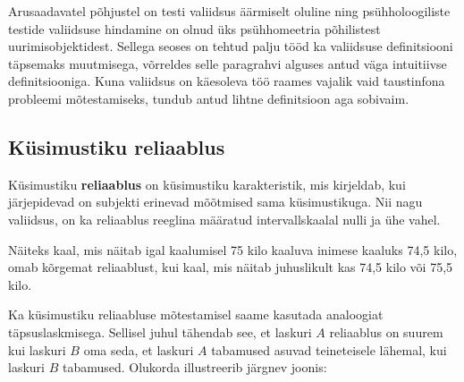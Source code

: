 \documentclass[a4paper,12pt,oneside]{article}
\numberwithin{equation}{section}
\theoremstyle{definition}
\begin{document}
Arusaadavatel põhjustel on testi valiidsus äärmiselt oluline ning psühholoogiliste testide valiidsuse hindamine on olnud üks psühhomeetria põhilistest uurimisobjektidest. Sellega seoses on tehtud palju tööd  ka valiidsuse definitsiooni täpsemaks muutmisega, võrreldes selle paragrahvi alguses antud väga intuitiivse definitsiooniga. Kuna valiidsus on käesoleva töö raames vajalik vaid taustinfona probleemi mõtestamiseks, tundub antud lihtne definitsioon aga sobivaim. 

\subsection{Küsimustiku reliaablus}

Küsimustiku \textbf{reliaablus} on küsimustiku karakteristik, mis kirjeldab, kui järje\-pidevad on subjekti erinevad mõõtmised sama küsimustikuga. Nii nagu valiidsus, on ka reliaablus reeglina määratud intervallskaalal nulli ja ühe vahel. 

Näiteks kaal, mis näitab igal kaalumisel 75 kilo kaaluva inimese kaaluks 74,5 kilo, omab kõrgemat reliaablust, kui kaal, mis näitab juhuslikult kas 74,5 kilo või 75,5 kilo. 

Ka küsimustiku reliaabluse mõtestamisel saame kasutada analoogiat täpsus\-lask\-misega. Sellisel juhul tähendab see, et laskuri $A$ reliaablus on suurem kui laskuri $B$ oma seda, et laskuri $A$ tabamused asuvad teineteisele lähemal, kui laskuri $B$ tabamused. Olukorda illustreerib järgnev joonis:
\end{document}
